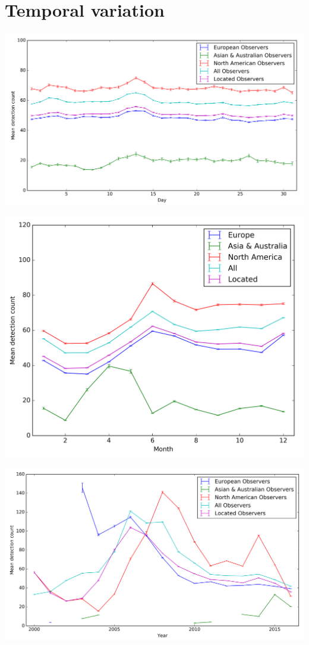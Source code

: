 \documentclass{beamer}
\begin{document}
	\section{Temporal variation}
	\begin{frame}
		\centering
		\includegraphics[width=\linewidth]{Dcombined}
	\end{frame}

	\begin{frame}
		\centering
		\includegraphics[width=\linewidth]{Mcombined}	
	\end{frame}

	\begin{frame}
		\centering
		\includegraphics[width=\linewidth]{Ycombined}
	\end{frame}
	
\end{document}
